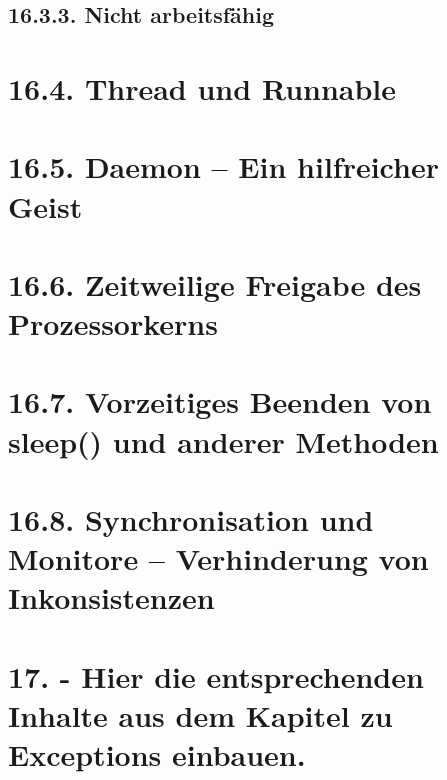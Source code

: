 \subsection{16.3.3.	Nicht arbeitsfähig}
\section{16.4.	Thread und Runnable}
\section{16.5.	Daemon – Ein hilfreicher Geist}
\section{16.6.	Zeitweilige Freigabe des Prozessorkerns}
\section{16.7.	Vorzeitiges Beenden von sleep() und anderer Methoden}
\section{16.8.	Synchronisation und Monitore – Verhinderung von Inkonsistenzen}
\section{17. - Hier die entsprechenden Inhalte aus dem Kapitel zu Exceptions einbauen.}
